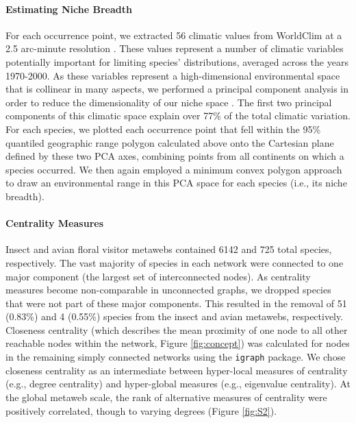 \documentclass[12pt]{article}
\begin{document}
\paragraph{Estimating Niche Breadth} 
For each occurrence point, we extracted 56 climatic values from WorldClim at a 2.5 arc-minute resolution \citep{fick2017worldclim}. These values represent a number of climatic variables potentially important for limiting species' distributions, averaged across the years 1970-2000. As these variables represent a high-dimensional environmental space that is collinear in many aspects, we performed a principal component analysis in order to reduce the dimensionality of our niche space \citep{kriticos2014extending, dallas2025linking}. The first two principal components of this climatic space explain over 77\% of the total climatic variation. For each species, we plotted each occurrence point that fell within the 95\% quantiled geographic range polygon calculated above onto the Cartesian plane defined by these two PCA axes, combining points from all continents on which a species occurred. We then again employed a minimum convex polygon approach to draw an environmental range in this PCA space for each species (i.e., its niche breadth).



\paragraph*{Centrality Measures}
Insect and avian floral visitor metawebs contained 6142 and 725 total species, respectively. The vast majority of species in each network were connected to one major component (the largest set of interconnected nodes). As centrality measures become non-comparable in unconnected graphs, we dropped species that were not part of these major components. This resulted in the removal of 51 (0.83\%) and 4 (0.55\%) species from the insect and avian metawebs, respectively. Closeness centrality (which describes the mean proximity of one node to all other reachable nodes within the network, Figure \ref{fig:concept}) was calculated for nodes in the remaining simply connected networks using the \texttt{igraph} package. 
We chose closeness centrality as an intermediate between hyper-local measures of centrality (e.g., degree centrality) and hyper-global measures (e.g., eigenvalue centrality). At the global metaweb scale, the rank of alternative measures of centrality were positively correlated, though to varying degrees (Figure \ref{fig:S2}).
\end{document}
